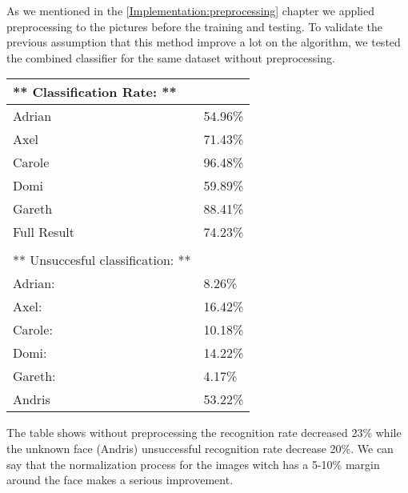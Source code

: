 As we mentioned in the \ref{Implementation:preprocessing} chapter we applied preprocessing to the pictures before the training and testing. To validate the previous assumption that this method improve a lot on the algorithm, we tested the combined classifier for the same dataset without preprocessing.

\begin{table}[h]
	\begin{tabular}{ll}
		\multicolumn{1}{l|}{** Classification Rate:                **} &         \\ \hline
		\multicolumn{1}{l|}{Adrian}                                    & 54.96\% \\
		\multicolumn{1}{l|}{Axel}                                      & 71.43\% \\
		\multicolumn{1}{l|}{Carole}                                    & 96.48\% \\
		\multicolumn{1}{l|}{Domi}                                      & 59.89\% \\
		\multicolumn{1}{l|}{Gareth}                                    & 88.41\% \\
		\multicolumn{1}{l|}{Full Result}                               & 74.23\% \\
		&         \\
		\multicolumn{1}{l|}{** Unsuccesful classification:         **} &         \\ \hline
		\multicolumn{1}{l|}{Adrian:}                                   & 8.26\%  \\
		\multicolumn{1}{l|}{Axel:}                                     & 16.42\% \\
		\multicolumn{1}{l|}{Carole:}                                   & 10.18\% \\
		\multicolumn{1}{l|}{Domi:}                                     & 14.22\% \\
		\multicolumn{1}{l|}{Gareth:}                                   & 4.17\%  \\ \hline
		\multicolumn{1}{l|}{Andris}                                    & 53.22\%
	\end{tabular}
\end{table}

 The table shows without preprocessing the recognition rate decreased 23\% while the unknown face (Andris) unsuccessful recognition rate decrease 20\%. We can say that the normalization process for the images witch has a 5-10\% margin around the face makes a serious improvement.